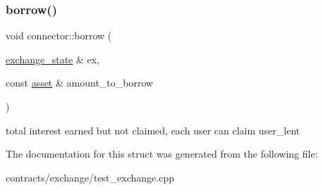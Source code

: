 \subsubsection{\texorpdfstring{borrow()}{borrow()}}
{\footnotesize\ttfamily void connector\+::borrow (\begin{DoxyParamCaption}\item[{\mbox{\hyperlink{structexchange__state}{exchange\+\_\+state}} \&}]{ex,  }\item[{const \mbox{\hyperlink{structasset}{asset}} \&}]{amount\+\_\+to\+\_\+borrow }\end{DoxyParamCaption})}

total interest earned but not claimed, each user can claim user\+\_\+lent 

The documentation for this struct was generated from the following file\+:\begin{DoxyCompactItemize}
\item 
contracts/exchange/test\+\_\+exchange.\+cpp\end{DoxyCompactItemize}
